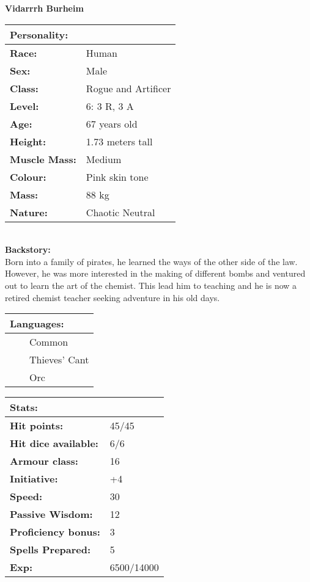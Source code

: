 \documentclass[11pt]{article}
\newcommand{\tabitem}{~~\llap{--}~~}
\begin{document}
	\begin{center}
\Huge \textbf{Vidarrrh Burheim}
	\end{center}
	\begin{multicols}{2}
\noindent \begin{tabularx}{\linewidth}{@{}l l}
\Large \textbf{Personality:} 	& 						\\
\hline
\textbf{Race:} 					& Human	 				\\
\textbf{Sex:} 					& Male 					\\
\textbf{Class:}					& Rogue and Artificer	\\
\textbf{Level:} 				& 6: 3 R, 3 A			\\
\textbf{Age:} 					& 67 years old			\\
\textbf{Height:} 				& 1.73 meters tall 		\\
\textbf{Muscle Mass:} 			& Medium 				\\
\textbf{Colour:} 				& Pink skin tone	 	\\
\textbf{Mass:} 					& 88 kg			 		\\
\textbf{Nature:} 				& Chaotic Neutral
		\end{tabularx} \\
\textbf{Backstory:} \\
Born into a family of pirates, he learned the ways of the other side of the law. However, he was more interested in the making of different bombs and ventured out to learn the art of the chemist. This lead him to teaching and he is now a retired chemist teacher seeking adventure in his old days.

\noindent \begin{tabularx}{\linewidth}{@{}l}
{\Large \textbf{Languages:}} \\
\hline
\tabitem Common \\
\tabitem Thieves' Cant \\
\tabitem Orc
		\end{tabularx}

\vspace{4mm}

\noindent \begin{tabularx}{\linewidth}{@{}l l}
\Large \textbf{Stats:}		 	& 									\\
\hline
\textbf{Hit points:} 			& 45/45 							\\
\textbf{Hit dice available:}	& 6/6								\\
\textbf{Armour class:} 			& 16							 	\\
\textbf{Initiative:} 			& +4								\\
\textbf{Speed:} 				& 30		 						\\
\textbf{Passive Wisdom:} 		& 12	 							\\
\textbf{Proficiency bonus:}		& 3									\\
\textbf{Spells Prepared:} 		& 5									\\
\textbf{Exp:} 					& 6500/14000
		\end{tabularx}


\end{multicols}
\end{document}
